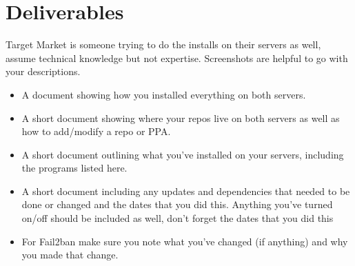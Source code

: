 \documentclass[12pt]{article}
\begin{document}
\section*{Deliverables}
Target Market is someone trying to do the installs on their servers as well, assume technical knowledge but not expertise.  Screenshots are helpful to go with your descriptions. 

\begin{itemize}
    \item A document showing how you installed everything on both servers.
    \item A short document showing where your repos live on both servers as well as how to add/modify a repo or PPA.
    \item A short document outlining what you've installed on your servers,  including the programs listed here.
    \item A short document including any updates and dependencies that needed to be done or changed and the dates that you did this.  Anything you've turned on/off should be included as well, don't forget the dates that you did this
    \item For Fail2ban make sure you note what you've changed (if anything) and why you made that change.
\end{itemize}
\end{document}
